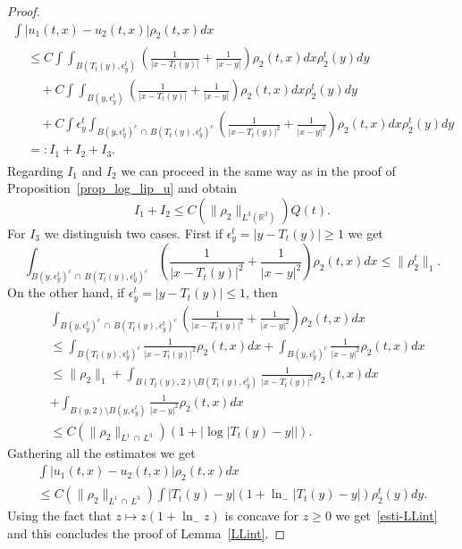 \documentclass[AHL,Unicode,longabstracts,published]{cedram}
\newcommand{\R}{\mathbb{R}}
\renewcommand{\leq}{\leqslant}
\renewcommand{\geq}{\geqslant}
\begin{document}
\begin{proof}
\begin{multline*}
\int|u_1(t,x)-u_2(t,x)|\rho_2(t,x)dx\\
\begin{aligned}
&\leq C \int \int_{B\left(T_t (y),\epsilon_y^t\right)} \left(\frac{1}{|x-T_t (y) |}+\frac{1}{|x-y|} \right)\rho_2(t,x) dx \rho_2^t(y) dy\\
&\quad + C \int \int_{B\left(y,\epsilon_y^t\right)} \left(\frac{1}{|x-T_t (y)|}+\frac{1}{|x-y|} \right)\rho_2(t,x) dx \rho_2^t(y) dy\\
&\quad +C \int \epsilon_y^t \int_{B\left(y,\epsilon_y^t\right)^c\, \cap\, B\left(T_t (y),\epsilon_y^t\right)^c} \left(\frac{1}{|x-T_t (y)|^2}+\frac{1}{|x-y|^2} \right)\rho_2(t,x) dx \rho_2^t(y) dy\\
&=: I_1+I_2+I_3.
\end{aligned}
\end{multline*}
Regarding $I_1$ and $I_2$ we can proceed in the same way as in the proof of Proposition~\ref{prop_log_lip_u} and obtain
\begin{equation*}
I_1 +I_2\leq C(\|\rho_2\|_{L^3 \left(\R^3\right)}) Q(t).
\end{equation*}
For $I_3$ we distinguish two cases. First if $\epsilon_y^t=|y-T_t (y)|\geq 1 $ we get
\[
\int_{B\left(y,\epsilon_y^t\right)^c\,\cap\,B\left(T_t (y),\epsilon_y^t\right)^c} \left(\frac{1}{|x-T_t (y)|^2}+\frac{1}{|x-y|^2} \right)\rho_2(t,x) dx \leq \|\rho_2^t\|_1.
\]
On the other hand, if $\epsilon_y^t=|y-T_t (y)|\leq 1 $, then
\begin{align*}
&\int_{B\left(y,\epsilon_y^t\right)^c\,\cap\, B\left(T_t (y),\epsilon_y^t\right)^c} \left(\frac{1}{|x-T_t (y)|^2}+\frac{1}{|x-y|^2} \right)\rho_2(t,x) dx \\
&\leq \int_{B(T_t (y),\epsilon_y^t)^c } \frac{1}{|x-T_t (y)|^2}\rho_2(t,x)dx + \int_{B\left(y,\epsilon_y^t\right)^c } \frac{1}{|x-y|^2}\rho_2(t,x)dx\\
& \leq\|\rho_2\|_1+ \int_{B\left(T_t (y),2\right)\setminus B\left(T_t (y),\epsilon_y^t\right) } \frac{1}{|x-T_t (y)|^2}\rho_2(t,x)dx\\
&+ \int_{B(y,2)\setminus B\left(y,\epsilon_y^t\right)} \frac{1}{|x-y|^2}\rho_2(t,x)dx\\
&\leq C(\|\rho_2\|_{L^1\,\cap\,L^3})(1+ |\log|T_t (y) -y||).
\end{align*}
Gathering all the estimates we get
\begin{multline*}
\int|u_1(t,x)-u_2(t,x)|\rho_2(t,x)dx \\
\leq C(\|\rho_2\|_{L^1\,\cap\,L^3}) \int |T_t (y) - y |(1+ \ln_{-}|T_t (y) - y |) \rho_2^t(y) dy.
\end{multline*}
Using the fact that $z\mapsto z(1+\ln_{-} z)$ is concave for $z\geq 0$ we get~\eqref{esti-LLint} and this concludes the proof of Lemma~\ref{LLint}.
\end{proof}
\end{document}
